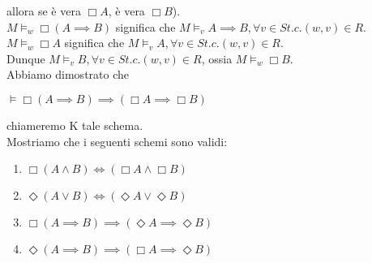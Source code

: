 \documentclass[a4paper,12pt]{article}
\theoremstyle{def}
\theoremstyle{prop}
\theoremstyle{esempio}
\theoremstyle{dimostrazione}
\theoremstyle{teo}
\theoremstyle{osservazione}
\begin{document}
allora se è vera \(\Box A\), è vera \(\Box B\)).\\
\(M \vDash_w \Box (A \implies B)\) significa che \(M \vDash_v A \implies B, \forall v \in S t.c. (w,v) \in R\).\\
\(M \vDash_w \Box A\) significa che \(M \vDash_v A, \forall v \in S t.c. (w,v) \in R\).\\
Dunque \(M \vDash_v B, \forall v \in S t.c. (w,v) \in R\), ossia \(M \vDash_w \Box B\).\\
Abbiamo dimostrato che 
\begin{center}
	\(\vDash \Box (A \implies B) \implies (\Box A \implies \Box B)\)
\end{center}
chiameremo K tale schema.\\
Mostriamo che i seguenti schemi sono validi:
\begin{enumerate}
	\item \(\Box (A \land B) \iff (\Box A \land \Box B)\)
	\item \(\Diamond (A \lor B) \iff (\Diamond A \lor \Diamond B)\)
	\item \(\Box (A \implies B) \implies (\Diamond A \implies \Diamond B)\)
	\item \(\Diamond (A \implies B) \implies (\Box A \implies \Diamond B)\)
\end{enumerate}
\newpage
\end{document}

